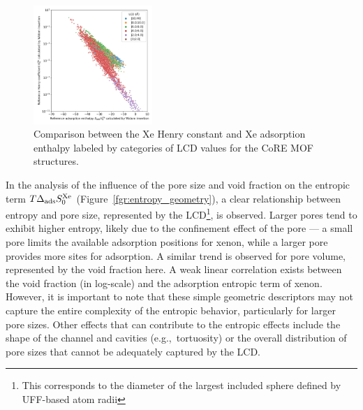 \documentclass[main.tex]{subfiles}
\begin{document}
\begin{figure}[ht]
  \centering
  \includegraphics[width=0.4\textwidth]{figures/2-thermo/H_Xe_widom_vs_K_Xe_widom_overview.jpg}
  \caption{Comparison between the Xe Henry constant and Xe adsorption enthalpy labeled by categories of LCD values for the CoRE MOF structures.}\label{fgr:henry_enthalpy}
\end{figure}

In the analysis of the influence of the pore size and void fraction on the entropic term $T\Delta_{\text{ads}}S^{\text{Xe}}_{\text{0}}$ (Figure~\ref{fgr:entropy_geometry}), a clear relationship between entropy and pore size, represented by the LCD\footnote[1]{This corresponds to the diameter of the largest included sphere defined by UFF-based atom radii}, is observed. Larger pores tend to exhibit higher entropy, likely due to the confinement effect of the pore --- a small pore limits the available adsorption positions for xenon, while a larger pore provides more sites for adsorption. A similar trend is observed for pore volume, represented by the void fraction here. A weak linear correlation exists between the void fraction (in log-scale) and the adsorption entropic term of xenon. However, it is important to note that these simple geometric descriptors may not capture the entire complexity of the entropic behavior, particularly for larger pore sizes. Other effects that can contribute to the entropic effects include the shape of the channel and cavities (e.g.,\ tortuosity) or the overall distribution of pore sizes that cannot be adequately captured by the LCD.
\end{document}

